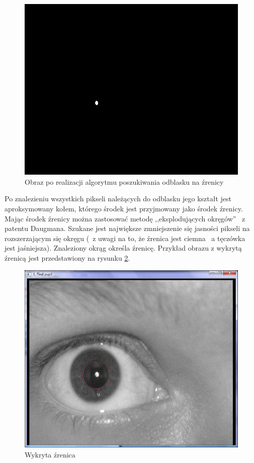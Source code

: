 \begin{figure}
\label{fig:dobryOdblask}
\begin{center}
\includegraphics[scale=0.5]{odblask.jpg}
\caption{Obraz po realizacji algorytmu poszukiwania odblasku na źrenicy}
\end{center}
\end{figure}

Po znalezieniu wszystkich pikseli należących do odblasku jego kształt jest aproksymowany kołem, którego środek jest przyjmowany jako środek źrenicy. Mając środek źrenicy można zastosować metodę ,,eksplodujących okręgów'' ~z patentu Daugmana. Szukane jest największe zmniejszenie się jasności pikseli na rozszerzającym się okręgu (~z uwagi na to, że źrenica jest ciemna ~a tęczówka jest jaśniejsza). Znaleziony okrąg określa źrenicę. Przykład obrazu z wykrytą źrenicą jest przedstawiony na rysunku \ref{fig:zrenicaNasza}.

\begin{figure}
\label{fig:zrenicaNasza}
\begin{center}
\includegraphics[scale=0.5]{zrenica.jpg}
\caption{Wykryta źrenica}
\end{center}
\end{figure}

